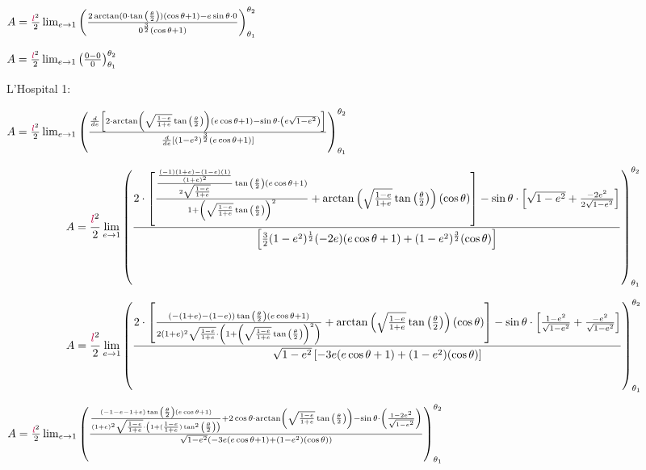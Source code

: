 \begin{flushleft}
$A=\frac{\textcolor{purple}{l}^2}{2}\lim_{e\rightarrow 1} \left(
\frac{2\arctan(0\cdot\tan{\left(\frac{\theta}{2}\right)})(\cos{\theta}+1)-\textcolor{black}{e}\sin{\theta}\cdot0}{0^{\frac{3}{2}}(\cos{\theta}+1)}
\right)_{\theta_1}^{\theta_2}$

$A=\frac{\textcolor{purple}{l}^2}{2}\lim_{e\rightarrow 1} \left(
\frac{0-0}{0}
\right)_{\theta_1}^{\theta_2}$

\bigskip
L'Hospital 1:
\bigskip

$A=\frac{\textcolor{purple}{l}^2}{2}\lim_{e\rightarrow 1} \left(
\frac
{\frac{d}{d\textcolor{black}{e}}\left[2\cdot\arctan\left(\sqrt{\frac{1-\textcolor{black}{e}}{1+\textcolor{black}{e}}}\tan{\left(\frac{\theta}{2}\right)}\right)(\textcolor{black}{e}\cos{\theta}+1)-\sin{\theta}\cdot\left(\textcolor{black}{e}\sqrt{1-\textcolor{black}{e}^2}\right)\right]}
{\frac{d}{d\textcolor{black}{e}}[(1-\textcolor{black}{e}^2)^{\frac{3}{2}}(\textcolor{black}{e}\cos{\theta}+1)]}
\right)_{\theta_1}^{\theta_2}$

$$A=\frac{\textcolor{purple}{l}^2}{2}\lim_{e\rightarrow 1} \left(
\frac{2\cdot\left[\frac{\frac{\frac{(-1)(1+\textcolor{black}{e})-(1-\textcolor{black}{e})(1)}{(1+\textcolor{black}{e})^2}}{2\sqrt{\frac{1-\textcolor{black}{e}}{1+\textcolor{black}{e}}}}\tan{\left(\frac{\theta}{2}\right)}(\textcolor{black}{e}\cos{\theta}+1)}{1+\left(\sqrt{\frac{1-\textcolor{black}{e}}{1+\textcolor{black}{e}}}\tan{\left(\frac{\theta}{2}\right)}\right)^2}+\arctan\left(\sqrt{\frac{1-\textcolor{black}{e}}{1+\textcolor{black}{e}}}\tan{\left(\frac{\theta}{2}\right)}\right)(\cos{\theta})\right]
-\sin{\theta}\cdot\left[\sqrt{1-\textcolor{black}{e}^2}+\frac{-2\textcolor{black}{e}^2}{2\sqrt{1-\textcolor{black}{e}^2}}\right]}
{\left[\frac{3}{2}(1-\textcolor{black}{e}^2)^{\frac{1}{2}}(-2\textcolor{black}{e})(\textcolor{black}{e}\cos{\theta}+1)+(1-\textcolor{black}{e}^2)^{\frac{3}{2}}(\cos{\theta})\right]}
\right)_{\theta_1}^{\theta_2}$$

$$A=\frac{\textcolor{purple}{l}^2}{2}\lim_{e\rightarrow 1} \left(
\frac{2\cdot\left[\frac{\left(-(1+\textcolor{black}{e})-(1-\textcolor{black}{e})\right)\tan{\left(\frac{\theta}{2}\right)}(\textcolor{black}{e}\cos{\theta}+1)}{2(1+\textcolor{black}{e})^2\sqrt{\frac{1-\textcolor{black}{e}}{1+\textcolor{black}{e}}}\cdot\left(1+\left(\sqrt{\frac{1-\textcolor{black}{e}}{1+\textcolor{black}{e}}}\tan{\left(\frac{\theta}{2}\right)}\right)^2\right)}+\arctan\left(\sqrt{\frac{1-\textcolor{black}{e}}{1+\textcolor{black}{e}}}\tan{\left(\frac{\theta}{2}\right)}\right)(\cos{\theta})\right]
-\sin{\theta}\cdot\left[\frac{1-\textcolor{black}{e}^2}{\sqrt{1-\textcolor{black}{e}^2}}+\frac{-\textcolor{black}{e}^2}{\sqrt{1-\textcolor{black}{e}^2}}\right]}
{\sqrt{1-\textcolor{black}{e}^2}\left[-3\textcolor{black}{e}(\textcolor{black}{e}\cos{\theta}+1)+(1-\textcolor{black}{e}^2)(\cos{\theta})\right]}
\right)_{\theta_1}^{\theta_2}$$

$A=\frac{\textcolor{purple}{l}^2}{2}\lim_{e\rightarrow 1} \left(
\frac{\frac{(-1-\textcolor{black}{e}-1+\textcolor{black}{e})\tan{\left(\frac{\theta}{2}\right)}(\textcolor{black}{e}\cos{\theta}+1)}{(1+\textcolor{black}{e})^2\sqrt{\frac{1-\textcolor{black}{e}}{1+\textcolor{black}{e}}}\cdot\left(1+(\frac{1-\textcolor{black}{e}}{1+\textcolor{black}{e}})\tan^2{\left(\frac{\theta}{2}\right)}\right)}+2\cos{\theta}\cdot\arctan\left(\sqrt{\frac{1-\textcolor{black}{e}}{1+\textcolor{black}{e}}}\tan{\left(\frac{\theta}{2}\right)}\right)
-\sin{\theta}\cdot\left(\frac{1-2\textcolor{black}{e}^2}{\sqrt{1-\textcolor{black}{e}^2}}\right)}
{\sqrt{1-\textcolor{black}{e}^2}\left(-3\textcolor{black}{e}(\textcolor{black}{e}\cos{\theta}+1)+(1-\textcolor{black}{e}^2)(\cos{\theta})\right)}
\right)_{\theta_1}^{\theta_2}$


\end{flushleft}
